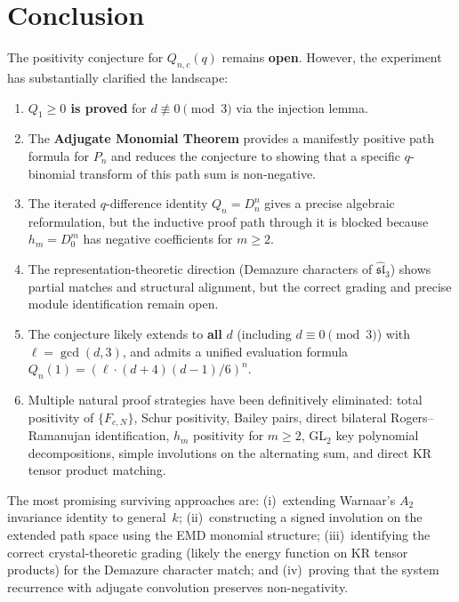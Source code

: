 \documentclass[11pt]{article}
\theoremstyle{definition}
\begin{document}
\part*{Conclusion}

The positivity conjecture for $Q_{n,c}(q)$ remains \textbf{open}. However, the experiment has substantially clarified the landscape:

\begin{enumerate}
\item \textbf{$Q_1 \geq 0$ is proved} for $d \not\equiv 0\!\pmod{3}$ via the injection lemma.

\item The \textbf{Adjugate Monomial Theorem} provides a manifestly positive path formula for $P_n$ and reduces the conjecture to showing that a specific $q$-binomial transform of this path sum is non-negative.

\item The iterated $q$-difference identity $Q_n = D_n^n$ gives a precise algebraic reformulation, but the inductive proof path through it is blocked because $h_m = D_0^m$ has negative coefficients for $m \geq 2$.

\item The representation-theoretic direction (Demazure characters of $\widehat{\mathfrak{sl}}_3$) shows partial matches and structural alignment, but the correct grading and precise module identification remain open.

\item The conjecture likely extends to \textbf{all} $d$ (including $d \equiv 0\!\pmod{3}$) with $\ell = \gcd(d,3)$, and admits a unified evaluation formula $Q_n(1) = (\ell \cdot (d+4)(d-1)/6)^n$.

\item Multiple natural proof strategies have been definitively eliminated: total positivity of $\{F_{c,N}\}$, Schur positivity, Bailey pairs, direct bilateral Rogers--Ramanujan identification, $h_m$ positivity for $m \geq 2$, GL$_2$ key polynomial decompositions, simple involutions on the alternating sum, and direct KR tensor product matching.
\end{enumerate}

The most promising surviving approaches are: (i)~extending Warnaar's $A_2$ invariance identity to general~$k$; (ii)~constructing a signed involution on the extended path space using the EMD monomial structure; (iii)~identifying the correct crystal-theoretic grading (likely the energy function on KR tensor products) for the Demazure character match; and (iv)~proving that the system recurrence with adjugate convolution preserves non-negativity.
\end{document}
